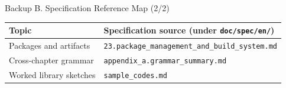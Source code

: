 \documentclass[aspectratio=169,11pt]{beamer}
\begin{document}
\begin{frame}[fragile,t]{Backup B. Specification Reference Map (2/2)}
\begin{footnotesize}
\setlength{\tabcolsep}{3pt}
\renewcommand{\arraystretch}{1.15}
\begin{tabularx}{\textwidth}{>{\raggedright\arraybackslash}X>{\raggedright\arraybackslash}X}
\toprule
\textbf{Topic} & \textbf{Specification source (under \texttt{doc/spec/en/})} \\
\midrule
Packages and artifacts & \texttt{23.package\_management\_and\_build\_system.md} \\
Cross-chapter grammar & \texttt{appendix\_a.grammar\_summary.md} \\
Worked library sketches & \texttt{sample\_codes.md} \\
\bottomrule
\end{tabularx}
\end{footnotesize}

\end{frame}
\end{document}
